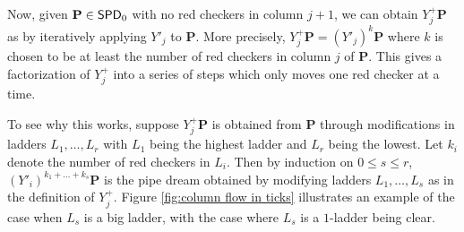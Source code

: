 \documentclass[11pt,reqno]{amsart} %
\newcommand{\bfP}{\mathbf{P}}
\DeclareMathOperator{\SPD}{\sf{SPD}}
\theoremstyle{definition}
\begin{document}
Now, given $\bfP\in \SPD_0$ with no red checkers in column $j+1$, we can obtain $Y^+_j\bfP$ as by iteratively applying $Y'_j$ to $\bfP$.
More precisely, $Y^+_j\bfP = (Y'_j)^k \bfP$ where $k$ is chosen to be at least the number of red checkers in column $j$ of $\bfP$.
This gives a factorization of $Y^+_j$ into a series of steps which only moves one red checker at a time.

To see why this works, suppose $Y^+_j \bfP$ is obtained from $\bfP$ through modifications in ladders $L_1,\dots,L_r$ with $L_1$ being the highest ladder and $L_r$ being the lowest.
Let $k_i$ denote the number of red checkers in $L_i$.
Then by induction on $0\leq s\leq r$, $(Y'_i)^{k_1+\dots+k_s}\bfP$ is the pipe dream obtained by modifying ladders $L_1,\dots,L_s$ as in the definition of $Y^+_j$.
Figure \ref{fig:column flow in ticks} illustrates an example of the case when $L_s$ is a big ladder, with the case where $L_s$ is a $1$-ladder being clear.
\end{document}
